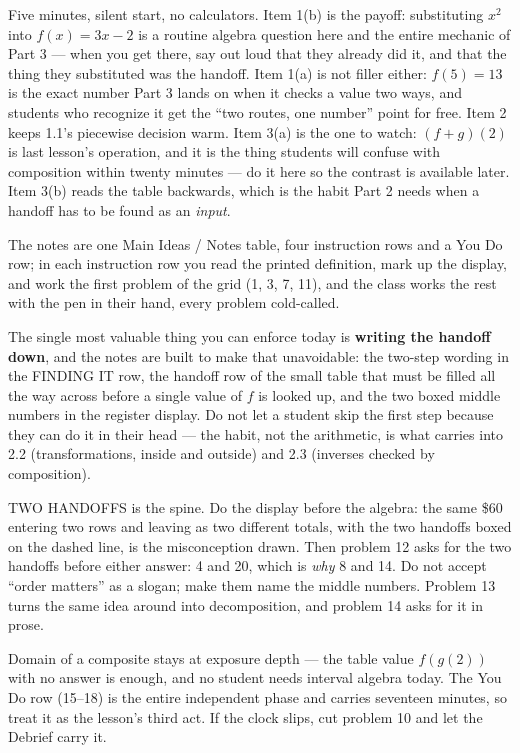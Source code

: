 \documentclass[10pt]{article}
\begin{document}
\begin{teachernote}[Warm-Up]
Five minutes, silent start, no calculators. Item 1(b) is the payoff: substituting $x^2$ into
$f(x) = 3x - 2$ is a routine algebra question here and the entire mechanic of Part 3 --- when you
get there, say out loud that they already did it, and that the thing they substituted was the
handoff. Item 1(a) is not filler either: $f(5) = 13$ is the exact number Part 3 lands on when it
checks a value two ways, and students who recognize it get the ``two routes, one number'' point
for free. Item 2 keeps 1.1's piecewise decision warm. Item 3(a) is the one to watch: $(f+g)(2)$ is
last lesson's operation, and it is the thing students will confuse with composition within twenty
minutes --- do it here so the contrast is available later. Item 3(b) reads the table backwards,
which is the habit Part 2 needs when a handoff has to be found as an \textit{input}.
\end{teachernote}

\begin{teachernote}
The notes are one Main Ideas / Notes table, four instruction rows and a You Do row; in each
instruction row you read the printed definition, mark up the display, and work the first problem
of the grid (1, 3, 7, 11), and the class works the rest with the pen in their hand, every problem
cold-called.

The single most valuable thing you can enforce today is \textbf{writing the handoff down}, and the
notes are built to make that unavoidable: the two-step wording in the FINDING IT row, the
handoff row of the small table that must be filled all the way across before a single value of $f$
is looked up, and the two boxed middle numbers in the register display. Do not let a student skip
the first step because they can do it in their head --- the habit, not the arithmetic, is what
carries into 2.2 (transformations, inside and outside) and 2.3 (inverses checked by composition).

TWO HANDOFFS is the spine. Do the display before the algebra: the same \$60 entering two rows and
leaving as two different totals, with the two handoffs boxed on the dashed line, is the
misconception drawn. Then problem 12 asks for the two handoffs before either answer: 4 and 20,
which is \emph{why} 8 and 14. Do not accept ``order matters'' as a slogan; make them name the
middle numbers. Problem 13 turns the same idea around into decomposition, and problem 14 asks for
it in prose.

Domain of a composite stays at exposure depth --- the table value $f(g(2))$ with no answer is
enough, and no student needs interval algebra today. The You Do row (15--18) is the entire
independent phase and carries seventeen minutes, so treat it as the lesson's third act. If the
clock slips, cut problem 10 and let the Debrief carry it.
\end{teachernote}
\end{document}
